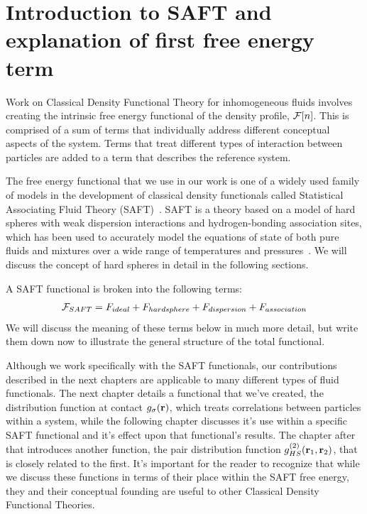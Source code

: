 \clearpage
\newpage



\section{Introduction to SAFT and explanation of first free energy term}

Work on Classical Density Functional Theory for inhomogeneous fluids
involves creating the intrinsic free energy functional of the density
profile, $\mathcal{F}[n]$.  This is comprised of a sum of terms that
individually address different conceptual aspects of the system.
Terms that treat different types of interaction between particles are
added to a term that describes the reference system.

The free energy functional that we use in our work is one of a widely
used family of models in the development of classical density
functionals called Statistical Associating Fluid Theory
(SAFT)~\cite{chapman1989saft}.  SAFT is a theory based on a model of
hard spheres with weak dispersion interactions and hydrogen-bonding
association sites, which has been used to accurately model the
equations of state of both pure fluids and mixtures over a wide range
of temperatures and pressures~\cite{muller2001molecular,
tan2008recent}. We will discuss the concept of hard spheres in detail
in the following sections.

A SAFT functional is broken into the following terms:
\begin{align}
  \mathcal{F}_{SAFT} = F_{ideal} + F_{hard sphere} + F_{dispersion} + F_{association}
\end{align}
We will discuss the meaning of these terms below in much more detail,
but write them down now to illustrate the general structure of the total
functional.


Although we work specifically with the SAFT functionals, our
contributions described in the next chapters are applicable to many
different types of fluid functionals.  The next chapter details a
functional that we've created, the distribution function at contact
$g_\sigma(\textbf{r})$, which treats correlations between particles within a
system, while the following chapter discusses it's use within a
specific SAFT functional and it's effect upon that functional's
results.  The chapter after that introduces another function, the pair
distribution function $g^{(2)}_{HS}(\textbf{r}_1,\textbf{r}_2)$, that is closely
related to the first.  It's important for the reader to recognize that
while we discuss these functions in terms of their place within the
SAFT free energy, they and their conceptual founding are useful to
other Classical Density Functional Theories.




